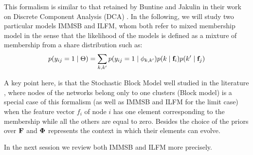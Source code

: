 This formalism is similar to that retained by Buntine and Jakulin in their work on Discrete Component Analysis (DCA) \cite{DCA}. In the following,  we will study two particular models IMMSB and ILFM, whom both refer to mixed membership model in the sense that the likelihood of the models is defined as a mixture of membership from a share distribution such as:
\begin{equation}
p(y_{ij}=1 \mid \Theta ) = \sum_{k, k'} p(y_{ij}=1\mid\phi_{k,k'}) p(k \mid \mathbf{f}_i) p(k' \mid \mathbf{f}_j)
\end{equation}

A key point here, is that the Stochastic Block Model well studied in the literature \cite{goldenberg2010survey}, where nodes of the networks belong only to one clusters (Block model) is a special case of this formalism (as well as IMMSB and ILFM for the limit case) when the feature vector $f_i$ of node $i$ has one element corresponding to the membership while all the others are equal to zero. Besides the choice of the priors over $\mathbf{F}$ and $\mathbf{\Phi}$ represents the context in which  their elements can evolve.

In the next session we review both IMMSB and ILFM more precisely.

